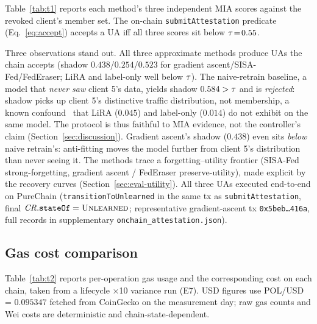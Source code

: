 Table~\ref{tab:t1} reports each method's three independent MIA
scores against the revoked client's member set. The on-chain
\texttt{submitAttestation} predicate (Eq.~\ref{eq:accept}) accepts a
UA iff all three scores sit below $\tau\!=\!0.55$.

\begin{table}[t]
\centering
\caption{Unlearning effectiveness (E6). MIA scores
against the revoked client's training data, evaluated on the
post-unlearning model. The on-chain gate accepts a UA iff all
three are below $\tauMIA = 0.55$.}
\label{tab:t1}
\footnotesize
\setlength{\tabcolsep}{4pt}
\resizebox{\columnwidth}{!}{}
\end{table}

Three observations stand out. All three approximate methods produce
UAs the chain accepts (shadow $0.438$/$0.254$/$0.523$ for gradient
ascent/SISA-Fed/FedEraser; LiRA and label-only well below
$\tau$). The naive-retrain baseline, a model that
\emph{never saw} client 5's data, yields shadow $0.584 >
\tau$ and is \emph{rejected}: shadow picks up client 5's
distinctive traffic distribution, not membership, a known
confound~\cite{shokri2017mia} that LiRA ($0.045$) and label-only
($0.014$) do not exhibit on the same model. The protocol is thus
faithful to MIA evidence, not the controller's claim
(Section~\ref{sec:discussion}). Gradient ascent's shadow ($0.438$) even
sits \emph{below} naive retrain's: anti-fitting moves the model
further from client 5's distribution than never seeing it. The
methods trace a forgetting--utility frontier (SISA-Fed
strong-forgetting, gradient ascent / FedEraser preserve-utility),
made explicit by the recovery curves (Section~\ref{sec:eval-utility}).
All three UAs executed end-to-end on PureChain
(\texttt{transitionToUnlearned} in the same tx as
\texttt{submitAttestation}, final
$\mathit{CR}.\mathtt{stateOf}=\textsc{Unlearned}$; representative
gradient-ascent tx \texttt{0x5beb\ldots 416a}, full records in
supplementary \texttt{onchain\_attestation.json}).

\subsection{Gas cost comparison}
\label{sec:eval-gas}

Table~\ref{tab:t2} reports per-operation gas usage and the
corresponding cost on each chain, taken from a lifecycle ×10
variance run (E7). USD figures use POL/USD = $0.095347$ fetched
from CoinGecko on the measurement day; raw gas counts and Wei
costs are deterministic and chain-state-dependent.

